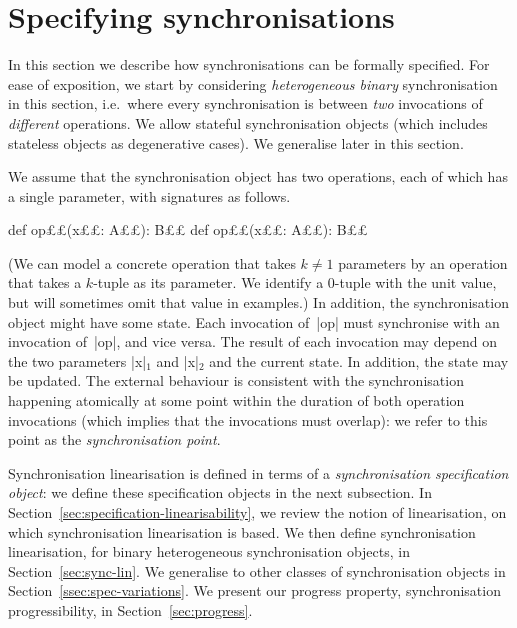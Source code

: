 \section{Specifying synchronisations}
\label{sec:spec}

In this section we describe how synchronisations can be formally specified.
For ease of exposition, we start by considering \emph{heterogeneous binary}
synchronisation in this section, i.e.~where every synchronisation is between
\emph{two} invocations of \emph{different} operations.  We allow stateful
synchronisation objects (which includes stateless objects as  degenerative
cases).  We generalise later in this section.


We assume that the synchronisation object has two operations, each of which
has a single parameter, with signatures as follows.
%
\begin{scala}
def op££(x££: A££): B££
def op££(x££: A££): B££
\end{scala}
%
(We can model a concrete operation that takes $k \ne 1$ parameters by an
operation that takes a $k$-tuple as its parameter.  We identify a 0-tuple with
the unit value, but will sometimes omit that value in examples.)
%
In addition, the synchronisation object might have some state.
Each invocation of~|op| must synchronise with an invocation of~|op|, and
vice versa.  The result of each invocation may depend on the two parameters
|x|$_1$ and |x|$_2$ and the current state.  In addition, the state may be
updated.  The external behaviour is consistent with the synchronisation
happening atomically at some point within the duration of both operation
invocations (which implies that the invocations must overlap): we refer to this
point as the \emph{synchronisation point}.

Synchronisation linearisation is defined in terms of a \emph{synchronisation
  specification object}: we define these specification objects in the next
subsection.  In Section~\ref{sec:specification-linearisability}, we review the
notion of linearisation, on which synchronisation linearisation is based.  We
then define synchronisation linearisation, for binary heterogeneous
synchronisation objects, in Section~\ref{sec:sync-lin}.  We generalise to
other classes of synchronisation objects in
Section~\ref{ssec:spec-variations}.  We present our progress property,
synchronisation progressibility, in Section~\ref{sec:progress}.


